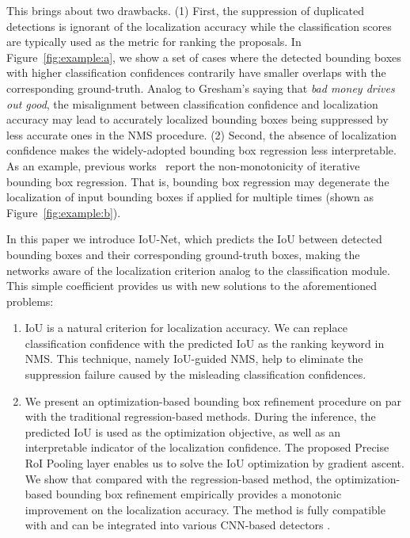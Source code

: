 \documentclass[runningheads]{llncs}
\begin{document}
This brings about two drawbacks.
(1) First, the suppression of duplicated detections is ignorant of the localization accuracy while the classification scores are typically used as the metric for ranking the proposals. In Figure~\ref{fig:example:a}, we show a set of cases where the detected bounding boxes with higher classification confidences contrarily have smaller overlaps with the corresponding ground-truth. Analog to Gresham's saying that {\it bad money drives out good}, the misalignment between classification confidence and localization accuracy may lead to accurately localized bounding boxes being suppressed by less accurate ones in the NMS procedure. (2) Second, the absence of localization confidence makes the widely-adopted bounding box regression less interpretable. As an example, previous works~\cite{cai2017cascade} report the non-monotonicity of iterative bounding box regression. That is, bounding box regression may degenerate the localization of input bounding boxes if applied for multiple times (shown as Figure~\ref{fig:example:b}).

In this paper we introduce IoU-Net, which predicts the IoU between detected bounding boxes and their corresponding ground-truth boxes, making the networks aware of the localization criterion analog to the classification module. This simple coefficient provides us with new solutions to the aforementioned problems:

\begin{enumerate}
    \item IoU is a natural criterion for localization accuracy. We can replace classification confidence with the predicted IoU as the ranking keyword in NMS. This technique, namely IoU-guided NMS, help to eliminate the suppression failure caused by the misleading classification confidences.
    \item We present an optimization-based bounding box refinement procedure on par with the traditional regression-based methods. During the inference, the predicted IoU is used as the optimization objective, as well as an interpretable indicator of the localization confidence. The proposed Precise RoI Pooling layer enables us to solve the IoU optimization by gradient ascent. We show that compared with the regression-based method, the optimization-based bounding box refinement empirically provides a monotonic improvement on the localization accuracy. The method is fully compatible with and can be integrated into various CNN-based detectors \cite{Lin_2017_CVPR,cai2017cascade,he2017mask}.
\end{enumerate}
\end{document}
